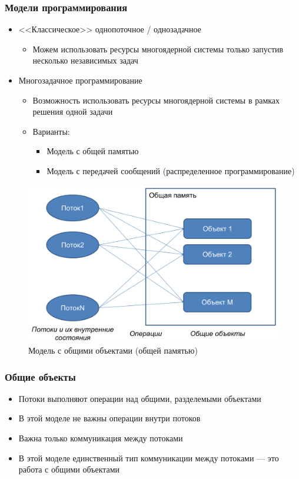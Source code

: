 \documentclass[10pt,a4paper,oneside,titlepage]{article}
\begin{document}
\subsubsection{Модели программирования}
\begin{itemize}
	\item <<Классическое>> однопоточное / однозадачное
	\begin{itemize}
		\item Можем использовать ресурсы многоядерной системы только запустив несколько независимых задач
	\end{itemize}
    \item Многозадачное программирование
    \begin{itemize}
    	\item Возможность использовать ресурсы многоядерной системы в рамках решения одной задачи
    	\item Варианты:
    	\begin{itemize}
    		\item Модель с общей памятью
    		\item Модель с передачей сообщений (распределенное программирование)
    	\end{itemize}
    \end{itemize}
\end{itemize}

\begin{figure}[h]
	\centering
	\includegraphics[width=0.7\linewidth]{pictures/CommonMemory}
	\caption{Модель с общими объектами (общей памятью)}
	\label{fig:commonmemory}
\end{figure}

\subsubsection{Общие объекты}
\begin{itemize}
	\item Потоки выполняют операции над общими, разделемыми объектами
	\item В этой моделе не важны операции внутри потоков
	\item Важна только коммуникация между потоками
	\item В этой моделе единственный тип коммуникации между потоками --- это работа с общими объектами
\end{itemize}
\end{document}
